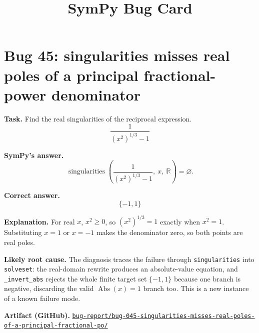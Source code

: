 \documentclass[11pt]{article}
\title{SymPy Bug Card}
\author{}
\date{}
\newcommand{\artifactrepo}{https://github.com/TODO-org/TODO-repo}
\newcommand{\bugbundle}[1]{\href{\artifactrepo/tree/main/bug-report/#1}{\nolinkurl{bug-report/#1/}}}
\begin{document}
\maketitle

\section*{Bug 45: singularities misses real poles of a principal fractional-power denominator}

\begin{counterexamplebox}
\textbf{Task.} Find the real singularities of the reciprocal expression.
\[
  \frac{1}{(x^2)^{1/3}-1}
\]

\medskip
\textbf{SymPy's answer.}
\[
  \operatorname{singularities}\!\left(\frac{1}{(x^2)^{1/3}-1},\ x,\ \mathbb{R}\right)=\varnothing.
\]

\medskip
\textbf{Correct answer.}
\[
  \{-1,1\}
\]

\medskip
\textbf{Explanation.} For real \(x\), \(x^2\ge 0\), so
\((x^2)^{1/3}=1\) exactly when \(x^2=1\). Substituting \(x=1\) or
\(x=-1\) makes the denominator zero, so both points are real poles.

\medskip
\textbf{Likely root cause.} The diagnosis traces the failure through
\texttt{singularities} into \texttt{solveset}: the real-domain rewrite produces
an absolute-value equation, and \texttt{\_invert\_abs} rejects the whole finite
target set \(\{-1,1\}\) because one branch is negative, discarding the valid
\(\operatorname{Abs}(x)=1\) branch too. This is a new instance of a known failure
mode.

\medskip
\textbf{Artifact (GitHub).} \bugbundle{bug-045-singularities-misses-real-poles-of-a-principal-fractional-po}
\end{counterexamplebox}
\end{document}
